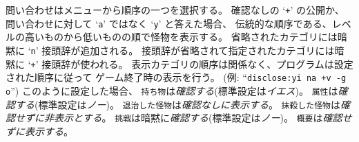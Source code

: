 問い合わせはメニューから順序の一つを選択する。
確認なしの `{\tt +}' の公開か、
問い合わせに対して `{\tt a}' ではなく `{\tt y}' と答えた場合、
伝統的な順序である、レベルの高いものから低いものの順で怪物を表示する。
省略されたカテゴリには暗黙に `{\tt n}' 接頭辞が追加される。
接頭辞が省略されて指定されたカテゴリには暗黙に `{\tt +}' 接頭辞が使われる。
表示カテゴリの順序は関係なく、プログラムは設定された順序に従って
ゲーム終了時の表示を行う。
(例: ``{\tt disclose:yi na +v -g o}'')
このように設定した場合、
{\tt 持ち物}は{\it 確認する\/}(標準設定は{\it イエス\/})。
{\tt 属性}は{\it 確認する\/}(標準設定は{\it ノー\/})。
{\tt 退治した怪物}は{\it 確認なしに表示する\/}。
{\tt 抹殺した怪物}は{\it 確認せずに非表示とする\/}。
{\tt 挑戦}は暗黙に{\it 確認する\/}(標準設定は{\it ノー\/})。
{\tt 概要}は{\it 確認せずに表示する\/}。

